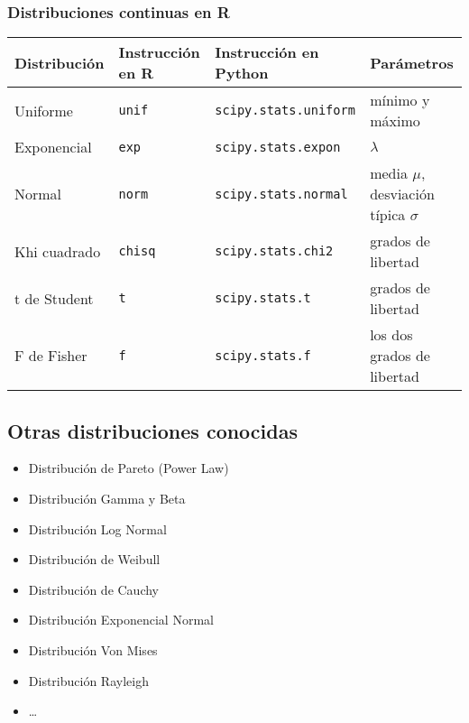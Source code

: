 \documentclass[
]{article}
\providecommand{\tightlist}{%
  \setlength{\itemsep}{0pt}\setlength{\parskip}{0pt}}
\begin{document}
\hypertarget{distribuciones-continuas-en-r}{%
\subsubsection{Distribuciones continuas en
R}\label{distribuciones-continuas-en-r}}

\begin{longtable}[]{@{}llll@{}}
\toprule
Distribución & Instrucción en R & Instrucción en Python & Parámetros \\
\midrule
\endhead
Uniforme & \texttt{unif} & \texttt{scipy.stats.uniform} & mínimo y
máximo \\
Exponencial & \texttt{exp} & \texttt{scipy.stats.expon} & \(\lambda\) \\
Normal & \texttt{norm} & \texttt{scipy.stats.normal} & media \(\mu\),
desviación típica \(\sigma\) \\
Khi cuadrado & \texttt{chisq} & \texttt{scipy.stats.chi2} & grados de
libertad \\
t de Student & \texttt{t} & \texttt{scipy.stats.t} & grados de
libertad \\
F de Fisher & \texttt{f} & \texttt{scipy.stats.f} & los dos grados de
libertad \\
\bottomrule
\end{longtable}

\hypertarget{otras-distribuciones-conocidas}{%
\subsection{Otras distribuciones
conocidas}\label{otras-distribuciones-conocidas}}

\begin{itemize}
\tightlist
\item
  Distribución de Pareto (Power Law)
\item
  Distribución Gamma y Beta
\item
  Distribución Log Normal
\item
  Distribución de Weibull
\item
  Distribución de Cauchy
\item
  Distribución Exponencial Normal
\item
  Distribución Von Mises
\item
  Distribución Rayleigh
\item
  \ldots{}
\end{itemize}
\end{document}
